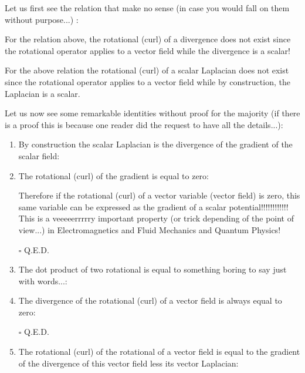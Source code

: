 	Let us first see the relation that make no sense (in case you would fall on them without purpose...) :
	
	For the relation above, the rotational (curl) of a divergence does not exist since the rotational operator applies to a vector field while the divergence is a scalar!
	
	For the above relation the rotational (curl) of a scalar Laplacian does not exist since the rotational operator applies to a vector field while by construction, the Laplacian is a scalar.
	
	Let us now see some remarkable identities without proof for the majority (if there is a proof this is because one reader did the request to have all the details...):
	\begin{enumerate}
		\item By construction the scalar Laplacian is the divergence of the gradient of the scalar field:
		
		
		\item The rotational (curl) of the gradient is equal to zero:
		
		Therefore if the rotational (curl) of a vector variable (vector field) is zero, this same variable can be expressed as the gradient of a scalar potential!!!!!!!!!!!! This is a veeeeerrrrry important property (or trick depending of the point of view...) in Electromagnetics and Fluid Mechanics and Quantum Physics!
		\begin{dem}
		
		\begin{flushright}
			$\square$  Q.E.D.
		\end{flushright}
		\end{dem}
		
		\item The dot product of two rotational is equal to something boring to say just with words...:
		
		
		\item The divergence of the rotational (curl) of a vector field is always equal to zero:
		
		\begin{dem}
		
		\begin{flushright}
			$\square$  Q.E.D.
		\end{flushright}
		\end{dem}
		
		\item The rotational (curl) of the rotational  of a vector field is equal to the gradient of the divergence of this vector field less its vector Laplacian:
		

\end{enumerate}
